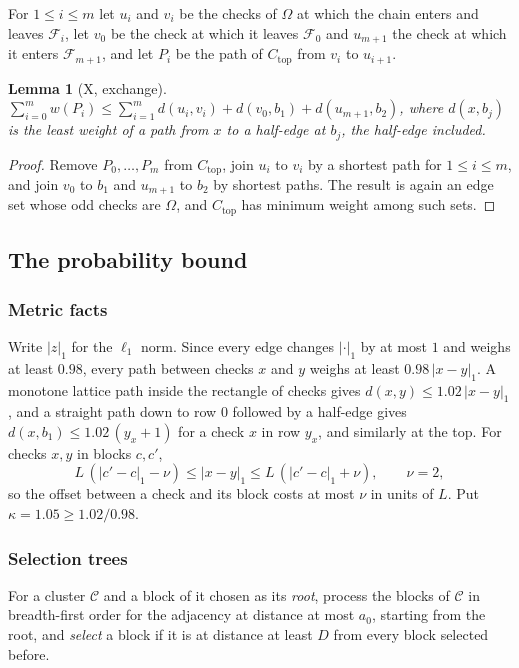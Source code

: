 \documentclass[11pt]{amsart}
\newtheorem{lemma}[theorem]{Lemma}
\theoremstyle{definition}
\theoremstyle{remark}
\numberwithin{equation}{section}
\newcommand{\cF}{\mathcal{F}}
\newcommand{\Ctop}{C_{\mathrm{top}}}
\begin{document}
For $1\le i\le m$ let $u_i$ and $v_i$ be the checks of $\Omega$ at which the chain enters and leaves $\cF_i$, let $v_0$ be the check at which it leaves $\cF_0$ and $u_{m+1}$ the check at which it enters $\cF_{m+1}$, and let $P_i$ be the path of $\Ctop$ from $v_i$ to $u_{i+1}$.

\begin{lemma}[X, exchange]\label{s1:lem:X}
$\displaystyle\sum_{i=0}^m w(P_i)\le\sum_{i=1}^md(u_i,v_i)+d(v_0,b_1)+d(u_{m+1},b_2)$, where $d(x,b_j)$ is the least weight of a path from $x$ to a half-edge at $b_j$, the half-edge included.
\end{lemma}

\begin{proof}
Remove $P_0,\dots,P_m$ from $\Ctop$, join $u_i$ to $v_i$ by a shortest path for $1\le i\le m$, and join $v_0$ to $b_1$ and $u_{m+1}$ to $b_2$ by shortest paths. The result is again an edge set whose odd checks are $\Omega$, and $\Ctop$ has minimum weight among such sets.
\end{proof}

\subsection{The probability bound}\label{s1:sec:bound}
\subsubsection{Metric facts}\label{s1:sec:metric}
Write $|z|_1$ for the $\ell_1$ norm. Since every edge changes $|\cdot|_1$ by at most $1$ and weighs at least $0.98$, every path between checks $x$ and $y$ weighs at least $0.98\,|x-y|_1$. A monotone lattice path inside the rectangle of checks gives $d(x,y)\le1.02\,|x-y|_1$, and a straight path down to row $0$ followed by a half-edge gives $d(x,b_1)\le1.02\,(y_x+1)$ for a check $x$ in row $y_x$, and similarly at the top. For checks $x,y$ in blocks $c,c'$,
\[
L\,(|c'-c|_1-\nu)\le|x-y|_1\le L\,(|c'-c|_1+\nu),\qquad\nu=2,
\]
so the offset between a check and its block costs at most $\nu$ in units of $L$. Put $\kappa=1.05\ge1.02/0.98$.

\subsubsection{Selection trees}\label{s1:sec:select}
For a cluster $\mathcal C$ and a block of it chosen as its \emph{root}, process the blocks of $\mathcal C$ in breadth-first order for the adjacency at distance at most $a_0$, starting from the root, and \emph{select} a block if it is at distance at least $D$ from every block selected before.
\end{document}
